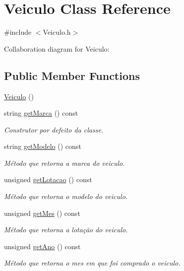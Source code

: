 \hypertarget{class_veiculo}{\section{Veiculo Class Reference}
\label{class_veiculo}
}


{\ttfamily \#include $<$Veiculo.\+h$>$}



Collaboration diagram for Veiculo\+:
\subsection*{Public Member Functions}
\begin{DoxyCompactItemize}
\item 
\hyperlink{class_veiculo_aafab27708a2639bc83a4c3721e57d196}{Veiculo} ()
\item 
string \hyperlink{class_veiculo_a2a9d144f41694ea56a33f20a1c97f80b}{get\+Marca} () const 
\begin{DoxyCompactList}\small\item\em Construtor por defeito da classe. \end{DoxyCompactList}\item 
string \hyperlink{class_veiculo_a96eb5720c0be78eb8ed7023904c6b1be}{get\+Modelo} () const 
\begin{DoxyCompactList}\small\item\em Método que retorna a marca do veiculo. \end{DoxyCompactList}\item 
unsigned \hyperlink{class_veiculo_aaebc59082f462ee46de233311281aef2}{get\+Lotacao} () const 
\begin{DoxyCompactList}\small\item\em Método que retorna o modelo do veiculo. \end{DoxyCompactList}\item 
unsigned \hyperlink{class_veiculo_a9cd8a208e3a1dbf1ba02281f1e97f99c}{get\+Mes} () const 
\begin{DoxyCompactList}\small\item\em Método que retorna a lotação do veiculo. \end{DoxyCompactList}\item 
unsigned \hyperlink{class_veiculo_af86f9122ce46d301c58e6247c641ff7b}{get\+Ano} () const 
\begin{DoxyCompactList}\small\item\em Método que retorna o mes em que foi comprado o veiculo. \end{DoxyCompactList}\item 

\end{DoxyCompactItemize}
